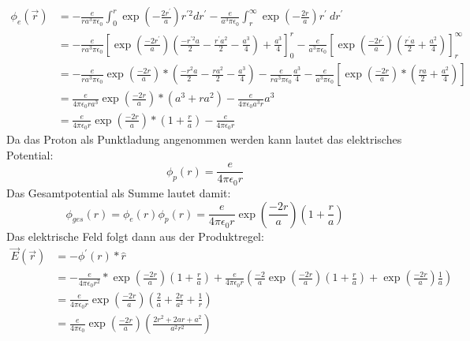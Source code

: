 \documentclass{article}
\newcommand{\epsz}{\epsilon_0}
\begin{document}
\begin{align*}
	\phi_e\left( \vec r \right)
	&= - \frac{e}{r a^3 \pi\epsz}
	\int_0^r
	\exp\left(-\frac{2r^\prime}{a} \right)
	r^{\prime 2}
	dr^\prime
	- \frac e {a^3 \pi\epsz}
	\int_r^\infty
	\exp\left(-\frac{2r}{a} \right)
	r^\prime \
	dr^\prime
	\\
	&= - \frac{e}{r a^3 \pi\epsz}
	\left[
		\exp\left(\frac{-2r^\prime}{a}\right)
		\left( \frac{-r^{\prime 2}a}{2} - \frac{r^\prime a^2}{2} - 
		\frac{a^3}{4}
		\right)
		+\frac{a^3}{4}
	\right]_0^r 
	- \frac e {a^3 \pi\epsz}
	\left[
		\exp\left(\frac{-2r^\prime}{a}\right)
		\left( \frac{r^\prime a}{2} + \frac{a^2}{4} \right)
	\right]_r^\infty
	\\
	&= - \frac{e}{r a^3 \pi\epsz}
		\exp\left( \frac{-2r}{a} \right) *
		\left(
		\frac{-r^2a}{2} - \frac{ra^2}{2} - \frac{a^3}{4}
		\right)
	- \frac{e}{r a^3 \pi\epsz}
		\frac{a^3}{4}
	- \frac{e}{a^3 \pi \epsz}
	\left[
		\exp\left( \frac{-2r}{a} \right) * 
		\left(
		\frac{ra}{2} + \frac{a^2}{4}
		\right)
	\right] \\
	&= \frac{e}{4\pi\epsz r a^3} \exp\left( \frac{-2r}{a} \right) *
	\left( a^3 + ra^2 \right) - \frac{e}{4\pi\epsz a^3 r} a^3 \\
	&= \frac{e}{4\pi\epsz r} \exp\left(\frac{-2r}{a}\right) *
	\left( 1 + \frac{r}{a} \right) - \frac{e}{4\pi\epsz r}
\end{align*}
Da das Proton als Punktladung angenommen werden kann lautet das elektrisches Potential:
\[
	\phi_p (r) = \frac{e}{4\pi\epsz r}
	\]
Das Gesamtpotential als Summe lautet damit:
\[
	\phi_{ges} (r) = \phi_e (r) \phi_p (r) =
	\frac{e}{4\pi\epsz r} \exp\left( \frac{-2r}{a}\right)
	\left( 1 + \frac r a \right)
\]
\newpage
Das elektrische Feld folgt dann aus der Produktregel:
\begin{align*}
	\vec E (\vec r) 
	&= -\phi^\prime(r) * \hat r \\
	&= -\frac{e}{4\pi\epsz r^2} * \exp\left(\frac{-2r}{a}\right)
	\left(1 + \frac ra \right)
	+ \frac{e}{4\pi\epsz r} \left(
	\frac{-2}{a} \exp\left(\frac{-2r}{a}\right) \left(1+\frac ra \right)
	+ \exp\left(\frac{-2r}{a}\right) \frac1a
	\right) \\
	&= \frac{e}{4\pi\epsz r} \exp\left(\frac{-2r}{a}\right)
	\left( \frac2a + \frac{2r}{a^2} + \frac1r \right) \\
	&= \frac{e}{4\pi\epsz} \exp\left(\frac{-2r}{a}\right)
	\left( \frac{2r^2 + 2ar + a^2}{a^2r^2} \right)
\end{align*}
\end{document}
